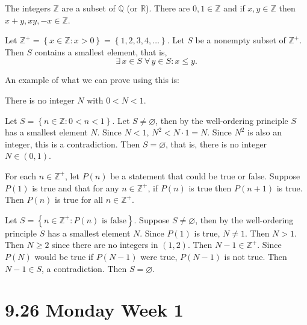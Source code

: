\documentclass{notes}
\begin{document}
\underline{}

The integers $\mathbb Z$ are a subset of $\mathbb Q$ (or $\mathbb R$).
There are $0, 1 \in \mathbb Z$ and if $x, y \in \mathbb Z$ then $x + y, x y, -x \in \mathbb Z$.

\begin{thm}
  Let $\mathbb Z^+ = \left \{ x \in \mathbb Z : x > 0 \right \} = \left \{ 1, 2, 3, 4, \dots \right \}$.
  Let $S$ be a nonempty subset of $\mathbb Z^+$.
  Then $S$ contains a smallest element, that is, 
  \[
    \exists \, x \in S \; \forall \, y \in S: x \leq y.
  \]
\end{thm}

An example of what we can prove using this is: 
\begin{prop}
  There is no integer $N$ with $0 < N < 1$.
\end{prop}

\begin{prf}
  Let $S = \left \{ n \in \mathbb Z : 0 < n < 1 \right \}$.
  Let $S \neq \varnothing$, then by the well-ordering principle $S$ has a smallest element $N$.
  Since $N < 1$, $N^2 < N \cdot 1 = N$.
  Since $N^2$ is also an integer, this is a contradiction.
  Then $S = \varnothing$, that is, there is no integer $N \in (0, 1)$.
\end{prf}

\begin{thm}[Induction]
  For each $n \in \mathbb Z^+$, let $P(n)$ be a statement that could be true or false.
  Suppose $P(1)$ is true and that for any $n \in \mathbb Z^+$, if $P(n)$ is true then $P(n + 1)$ is true.
  Then $P(n)$ is true for all $n \in \mathbb Z^+$.
\end{thm}

\begin{prf}
  Let $S = \left \{ n \in \mathbb Z^+ : P(n) \text{ is false} \right \}$.
  Suppose $S \neq \varnothing$, then by the well-ordering principle $S$ has a smallest element $N$.
  Since $P(1)$ is true, $N \neq 1$.
  Then $N > 1$.
  Then $N \geq 2$ since there are no integers in $(1, 2)$.
  Then $N - 1 \in \mathbb Z^+$.
  Since $P(N)$ would be true if $P(N - 1)$ were true, $P(N - 1)$ is not true.
  Then $N - 1 \in S$, a contradiction.
  Then $S = \varnothing$.
\end{prf}

\newpage

\section{9.26 Monday Week 1}
\end{document}
